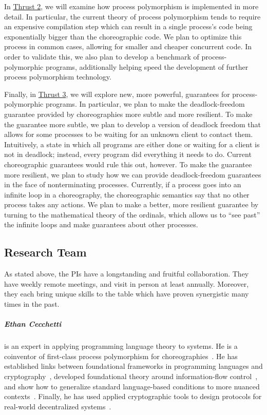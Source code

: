 In \hyperref[sec:t2]{Thrust 2}, we will examine how process polymorphism is implemented in more detail.
In particular, the current theory of process polymorphism tends to require an expensive compilation step which can result in a single process's code being exponentially bigger than the choreographic code.
We plan to optimize this process in common cases, allowing for smaller and cheaper concurrent code.
In order to validate this, we also plan to develop a benchmark of process-polymorphic programs, additionally helping speed the development of further process polymorphism technology.

Finally, in \hyperref[sec:t3]{Thrust 3}, we will explore new, more powerful, guarantees for process-polymorphic programs.
In particular, we plan to make the deadlock-freedom guarantee provided by choreographies more subtle and more resilient.
To make the guarantee more subtle, we plan to develop a version of deadlock freedom that allows for some processes to be waiting for an unknown client to contact them.
Intuitively, a state in which all programs are either done or waiting for a client is not in deadlock; instead, every program did everything it needs to do.
Current choreographic guarantees would rule this out, however.
To make the guarantee more resilient, we plan to study how we can provide deadlock-freedom guarantees in the face of nonterminating processes.
Currently, if a process goes into an infinite loop in a choreography, the choreographic semantics say that no other process takes any actions.
We plan to make a better, more resilient guarantee by turning to the mathematical theory of the ordinals, which allows us to ``see past'' the infinite loops and make guarantees about other processes.

\subsection{Research Team}

As stated above, the PIs have a longstanding and fruitful collaboration.
They have weekly remote meetings, and visit in person at least annually.
Moreover, they each bring unique skills to the table which have proven synergistic many times in the past.

\subparagraph{Ethan Cecchetti} is an expert in applying programming language theory to systems.
He is a coinventor of first-class process polymorphism for choreographies~\citep{SamuelsonHC25}.
He has established links between foundational frameworks in programming languages and cryptography~\citep{KuennemannPC24,PatrignaniKWC24},
developed foundational theory around information-flow control~\citep{HirschACAT20,HirschC21,SilverHCHZ23},
and show how to generalize standard language-based conditions to more nuanced contexts~\citep{CecchettiMA17,CecchettiYNM21,Cecchetti25}.
Finally, he has used applied cryptographic tools to design protocols for real-world decentralized systems~\citep{ZhangCCJS16,CecchettiZJKJS17,CrooksBCHAA18,CecchettiFMJ19}.


